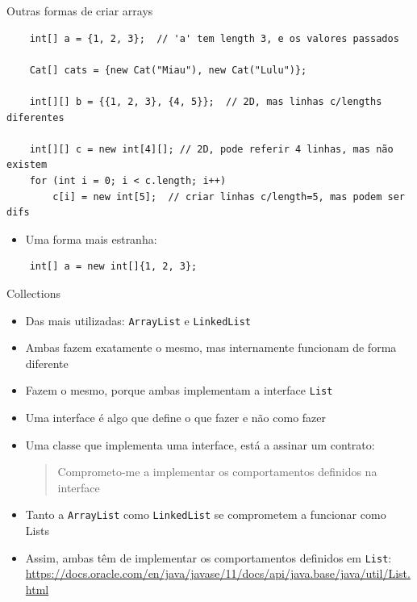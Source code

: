 \documentclass[portuguese, aspectratio=169, xcolor=table]{beamer}
\begin{document}
\begin{frame}[fragile]{Outras formas de criar arrays}
\begin{verbatim}
    int[] a = {1, 2, 3};  // 'a' tem length 3, e os valores passados

    Cat[] cats = {new Cat("Miau"), new Cat("Lulu")};

    int[][] b = {{1, 2, 3}, {4, 5}};  // 2D, mas linhas c/lengths diferentes

    int[][] c = new int[4][]; // 2D, pode referir 4 linhas, mas não existem
    for (int i = 0; i < c.length; i++)
        c[i] = new int[5];  // criar linhas c/length=5, mas podem ser difs
\end{verbatim}
\vfill

\begin{itemize}
    \item Uma forma mais estranha:
\end{itemize}
\begin{verbatim}
    int[] a = new int[]{1, 2, 3};
\end{verbatim}
\end{frame}


\begin{frame}{Collections}
\begin{itemize}
    \item Das mais utilizadas: \texttt{ArrayList} e \texttt{LinkedList}
    \item Ambas fazem exatamente o mesmo, mas internamente funcionam de forma diferente
    \item Fazem o mesmo, porque ambas implementam a interface \texttt{List}
    \item Uma interface é algo que define o que fazer e não como fazer
    \item Uma classe que implementa uma interface, está a assinar um contrato:
    
    \begin{quotation}
        Comprometo-me a implementar os comportamentos definidos na interface
    \end{quotation}
\item Tanto a \texttt{ArrayList} como \texttt{LinkedList} se comprometem a funcionar como Lists
\item Assim, ambas têm de implementar os comportamentos definidos em \texttt{List}:
\href{https://docs.oracle.com/en/java/javase/11/docs/api/java.base/java/util/List.html}{https://docs.oracle.com/en/java/javase/11/docs/api/java.base/java/util/List.html}
\end{itemize}
\end{frame}
\end{document}
